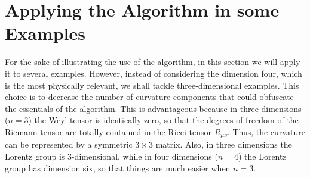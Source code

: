 \documentclass[twocolumn,prd,aps,showpacs,showkeys,amsmath,amssymb]{revtex4-1}
\begin{document}
\section{Applying the Algorithm in some Examples}\label{Sec.Examples}


For the sake of illustrating the use of the algorithm, in this section we will apply it to several examples. However, instead of considering the dimension four, which is the most physically relevant, we shall tackle three-dimensional examples. This choice is to decrease the number of curvature components that could obfuscate the essentials of the algorithm. This is advantageous because in three dimensions ($n=3$) the Weyl tensor is identically zero, so that the degrees of freedom of the Riemann tensor are totally contained in the Ricci tensor $R_{\mu\nu}$. Thus, the curvature can be represented by a symmetric $3\times 3$ matrix. Also, in three dimensions the Lorentz group is 3-dimensional, while in four dimensions ($n=4$) the Lorentz group has dimension six, so that things are much easier when $n=3$.

\end{document}
